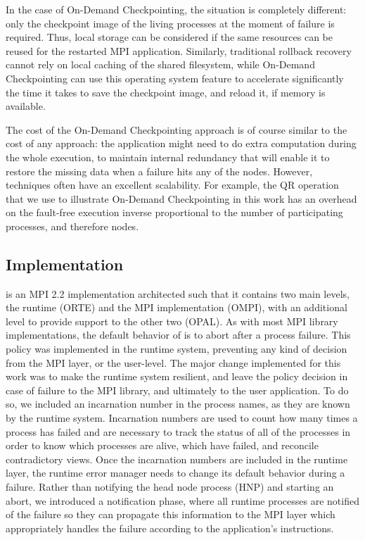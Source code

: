 In the case of On-Demand Checkpointing, the situation is completely
different: only the checkpoint image of the living processes at the
moment of failure is required. Thus, local storage can be considered
if the same resources can be reused for the restarted MPI
application. Similarly, traditional rollback recovery cannot rely on
local caching of the shared filesystem, while On-Demand Checkpointing
can use this operating system feature to accelerate significantly the
time it takes to save the checkpoint image, and reload it, if memory
is available.

The cost of the On-Demand Checkpointing approach is of course similar
to the cost of any \abft approach: the application might need to do
extra computation during the whole execution, to maintain internal
redundancy that will enable it to restore the missing data when a
failure hits any of the nodes. However, \abft techniques often have an
excellent scalability. For example, the \abft QR operation that we use
to illustrate On-Demand Checkpointing in this work has an overhead on
the fault-free execution inverse proportional to the number of
participating processes, and therefore nodes.


\subsection{\ompi Implementation\label{sec:mpi}}

\ompi is an MPI 2.2 implementation architected such that it contains
two main levels, the runtime (ORTE) and the MPI implementation (OMPI),
with an additional level to provide support to the other two
(OPAL). As with most MPI library implementations, the default behavior
of \ompi is to abort after a process failure. This policy was
implemented in the runtime system, preventing any kind of decision
from the MPI layer, or the user-level. The major change implemented
for this work was to make the runtime system resilient, and leave the
policy decision in case of failure to the MPI library, and ultimately
to the user application. To do so, we included an incarnation number
in the process names, as they are known by the runtime
system. Incarnation numbers are used to count how many times a process
has failed and are necessary to track the status of all of the
processes in order to know which processes are alive, which have
failed, and reconcile contradictory views. Once the incarnation numbers
are included in the runtime layer, the runtime error manager needs to
change its default behavior during a failure. Rather than notifying
the head node process (HNP) and starting an abort, we introduced a
notification phase, where all runtime processes are notified of the
failure so they can propagate this information to the MPI layer which
appropriately handles the failure according to the application's
instructions.

